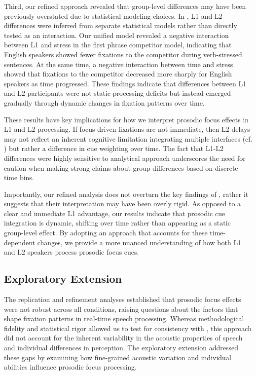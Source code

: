 Third, our refined approach revealed that group-level differences may have been previously overstated due to statistical modeling choices. In \cite{Ge2021}, L1 and L2 differences were inferred from separate statistical models rather than directly tested as an interaction. Our unified model revealed a negative interaction between L1 and stress in the first phrase competitor model, indicating that English speakers showed fewer fixations to the competitor during verb-stressed sentences. At the same time, a negative interaction between time and stress showed that fixations to the competitor decreased more sharply for English speakers as time progressed. These findings indicate that differences between L1 and L2 participants were not static processing deficits but instead emerged gradually through dynamic changes in fixation patterns over time.

These results have key implications for how we interpret prosodic focus effects in L1 and L2 processing. If focus-driven fixations are not immediate, then L2 delays may not reflect an inherent cognitive limitation integrating multiple interfaces (cf. \cite{sorace2006anaphora,sorace2011pinning}) but rather a difference in cue weighting over time. The fact that L1-L2 differences were highly sensitive to analytical approach underscores the need for caution when making strong claims about group differences based on discrete time bins.

Importantly, our refined analysis does not overturn the key findings of \cite{Ge2021}, rather it suggests that their interpretation may have been overly rigid. As opposed to a clear and immediate L1 advantage, our results indicate that prosodic cue integration is dynamic, shifting over time rather than appearing as a static group-level effect. By adopting an approach that accounts for these time-dependent changes, we provide a more nuanced understanding of how both L1 and L2 speakers process prosodic focus cues.

\subsection{Exploratory Extension}

The replication and refinement analyses established that prosodic focus effects were not robust across all conditions, raising questions about the factors that shape fixation patterns in real-time speech processing. Whereas methodological fidelity and statistical rigor allowed us to test for consistency with \cite{Ge2021}, this approach did not account for the inherent variability in the acoustic properties of speech and individual differences in perception. The exploratory extension addressed these gaps by examining how fine-grained acoustic variation and individual abilities influence prosodic focus processing. 

